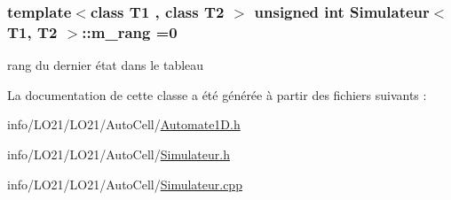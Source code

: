 \subsubsection[{\texorpdfstring{m\+\_\+rang}{m_rang}}]{\setlength{\rightskip}{0pt plus 5cm}template$<$class T1 , class T2 $>$ unsigned int {\bf Simulateur}$<$ T1, T2 $>$\+::m\+\_\+rang =0\hspace{0.3cm}{\ttfamily [private]}}\hypertarget{class_simulateur_a40f39f55c107779de9c1b4418b98f7c0}{}\label{class_simulateur_a40f39f55c107779de9c1b4418b98f7c0}
rang du dernier état dans le tableau 

La documentation de cette classe a été générée à partir des fichiers suivants \+:\begin{DoxyCompactItemize}
\item 
info/\+L\+O21/\+L\+O21/\+Auto\+Cell/\hyperlink{_automate1_d_8h}{Automate1\+D.\+h}\item 
info/\+L\+O21/\+L\+O21/\+Auto\+Cell/\hyperlink{_simulateur_8h}{Simulateur.\+h}\item 
info/\+L\+O21/\+L\+O21/\+Auto\+Cell/\hyperlink{_simulateur_8cpp}{Simulateur.\+cpp}\end{DoxyCompactItemize}
